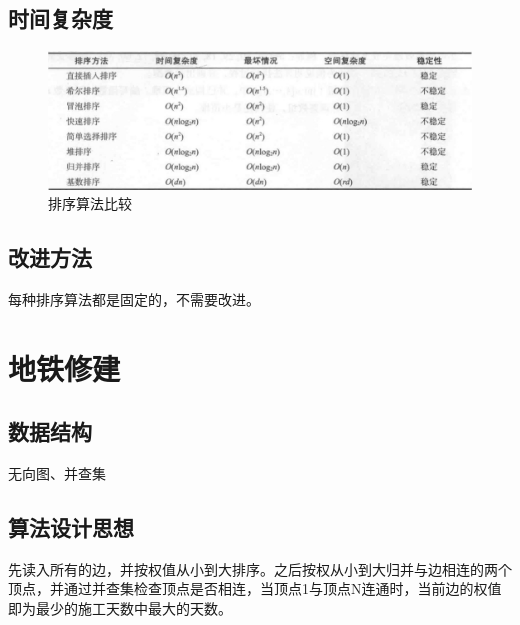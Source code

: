 \documentclass[a4paper,11pt,UTF8]{ctexart}
\begin{document}
\subsection{时间复杂度}

\begin{figure}[htbp] %
    \centering
    \includegraphics[width=13cm]{3.jpg}
    \caption{排序算法比较}
\end{figure}

\subsection{改进方法}

每种排序算法都是固定的，不需要改进。



\section{地铁修建}
\subsection{数据结构}
无向图、并查集
\subsection{算法设计思想}
先读入所有的边，并按权值从小到大排序。之后按权从小到大归并与边相连的两个顶点，并通过并查集检查顶点是否相连，当顶点1与顶点N连通时，当前边的权值即为最少的施工天数中最大的天数。
\end{document}
